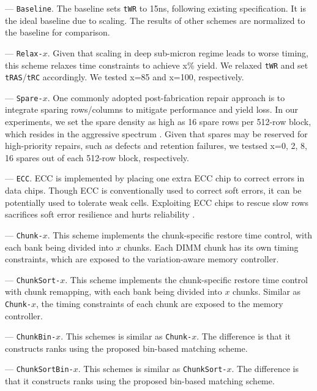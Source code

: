 --- \texttt{Baseline}. The baseline sets {\tt tWR} to 15ns, following existing specification. It is the ideal baseline due to scaling. The results of other schemes are normalized to the baseline for comparison.

--- \texttt{Relax-}$x$. Given that scaling in deep sub-micron regime leads to worse timing, this scheme relaxes time constraints to achieve x\% yield. We relaxed {\tt tWR} and set {\tt tRAS}/{\tt tRC} accordingly. We tested x=85 and x=100, respectively.

--- \texttt{Spare-}$x$. One commonly adopted post-fabrication repair approach is to integrate sparing rows/columns \cite{BOOK:jacob} to mitigate performance and yield loss. 
In our experiments, we set the spare density as high as 16 spare rows per 512-row block, which resides in the aggressive spectrum \cite{BOOK:fault,SSC96:spare}. Given that spares may be reserved for high-priority repairs, such as defects and retention failures, we testsed x=0, 2, 8, 16 spares out of each 512-row block, respectively. 

--- \texttt{ECC}. ECC is implemented by placing one extra ECC chip to correct errors in data chips. Though ECC is conventionally used to correct soft errors, it can be potentially used to tolerate weak cells. Exploiting ECC chips to rescue slow rows sacrifices soft error resilience and hurts reliability \cite{DFT05:ecc}.  

--- {\tt Chunk-}$x$. This scheme implements the chunk-specific restore time control, with each bank being divided into $x$ chunks. Each DIMM chunk has its own timing constraints, which are exposed to the variation-aware memory controller.

--- \texttt{ChunkSort-}$x$. This scheme implements the chunk-specific restore time control with chunk remapping, with each bank being divided into $x$ chunks. Similar as {\tt Chunk-}$x$, the timing constraints of each chunk are exposed to the memory controller.

--- \texttt{ChunkBin-}$x$. This schemes is similar as {\tt Chunk-}$x$. The difference is that it constructs ranks using the proposed bin-based matching scheme.

--- \texttt{ChunkSortBin-}$x$.  This schemes is similar as {\tt ChunkSort-}$x$. The difference is that it constructs ranks using the proposed bin-based matching scheme.


